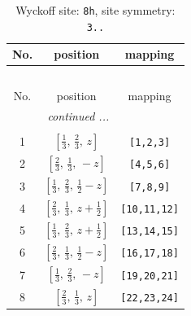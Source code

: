 \documentclass[fleqn,8pt]{jsarticle}
\begin{document}
\begin{longtable}{ccc}
\caption{Wyckoff site: {\tt 8h}, site symmetry: {\tt 3..}}
 \\
 \hline \hline
No. & position & mapping \\ \hline \endfirsthead

\multicolumn{2}{l}{\tablename\ \thetable{}} \\
 \hline \hline
No. & position & mapping \\ \hline \endhead

 \hline \hline
\multicolumn{2}{r}{\footnotesize\it continued ...} \\ \endfoot

 \hline \hline
\multicolumn{2}{r}{} \\ \endlastfoot

1 & $\left[ \frac{1}{3},\, \frac{2}{3},\, z \right]$ & {\tt [1,2,3]} \\ \hline
2 & $\left[ \frac{2}{3},\, \frac{1}{3},\, - z \right]$ & {\tt [4,5,6]} \\ \hline
3 & $\left[ \frac{1}{3},\, \frac{2}{3},\, \frac{1}{2} - z \right]$ & {\tt [7,8,9]} \\ \hline
4 & $\left[ \frac{2}{3},\, \frac{1}{3},\, z + \frac{1}{2} \right]$ & {\tt [10,11,12]} \\ \hline
5 & $\left[ \frac{1}{3},\, \frac{2}{3},\, z + \frac{1}{2} \right]$ & {\tt [13,14,15]} \\ \hline
6 & $\left[ \frac{2}{3},\, \frac{1}{3},\, \frac{1}{2} - z \right]$ & {\tt [16,17,18]} \\ \hline
7 & $\left[ \frac{1}{3},\, \frac{2}{3},\, - z \right]$ & {\tt [19,20,21]} \\ \hline
8 & $\left[ \frac{2}{3},\, \frac{1}{3},\, z \right]$ & {\tt [22,23,24]} \\
\end{longtable}
\renewcommand{\arraystretch}{1.2}
\end{document}

